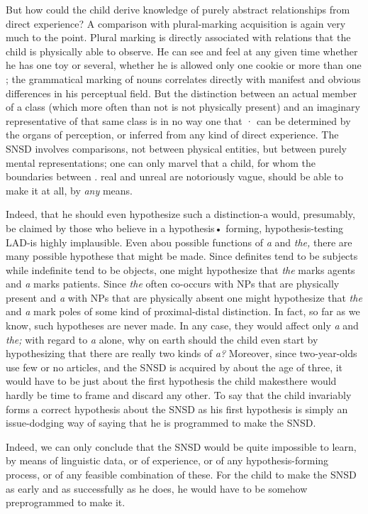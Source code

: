 But how could the child derive knowledge of purely abstract relationships from direct experience? A comparison with plural-marking acquisition is again very much to the point. Plural marking is directly associated with relations that the child is physically able to observe. He can see and feel at any given time whether he has one toy or several, whether he is allowed only one cookie or more than one ; the gramma\-tical marking of nouns correlates directly with manifest and obvious differences in his perceptual field. But the distinction between an actual member of a class (which more often than not is not physically present) and an imaginary representative of that same class is in no way one that · can be determined by the organs of perception, or inferred from any kind of direct experience. The SNSD involves comparisons, not between physical entities, but between purely mental representations; one can only marvel that a child, for whom the boundaries between . real and unreal are notoriously vague, should be able to make it at
all, by \textit{any} means.

Indeed, that he should even hypothesize such a distinction-a would, presumably, be claimed by those who believe in a hypothesis• forming, hypothesis-testing LAD-is highly implausible. Even abou possible functions of \textit{a} and \textit{the,} there are many possible hypothese that might be made. Since definites tend to be subjects while indefinite tend to be objects, one might hypothesize that \textit{the} marks agents and
\textit{a} marks patients. Since \textit{the} often co-occurs with NPs that are physically present and \textit{a} with NPs that are physically absent one might hy\-pothesize that \textit{the }and \textit{a} mark poles of some kind of proximal-distal distinction. In fact, so far as we know, such hypotheses are never made. In any case, they would affect only \textit{a} and \textit{the; }with regard to \textit{a} alone, why on earth should the child even start by hypothesizing that there are really two kinds of \textit{a? }Moreover, since two-year-olds use few or no articles, and the SNSD is acquired by about the age of three, it would have to be just about the first hypothesis the child makes\-there would hardly be time to frame and discard any other. To say that the child invariably forms a correct hypothesis about the SNSD as his first hypothesis is simply an issue-dodging way of saying that he is programmed to make the SNSD.

Indeed, we can only conclude that the SNSD would be quite impossible to learn, by means of linguistic data, or of experience, or of any hypothesis-forming process, or of any feasible combination of these. For the child to make the SNSD as early and as successfully as he does, he would have to be somehow preprogrammed to make it.

